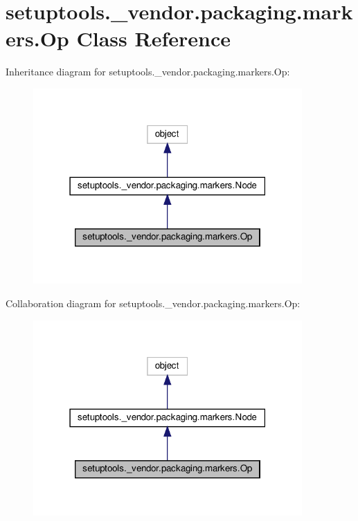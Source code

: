 \hypertarget{classsetuptools_1_1__vendor_1_1packaging_1_1markers_1_1Op}{}\section{setuptools.\+\_\+vendor.\+packaging.\+markers.\+Op Class Reference}
\label{classsetuptools_1_1__vendor_1_1packaging_1_1markers_1_1Op}


Inheritance diagram for setuptools.\+\_\+vendor.\+packaging.\+markers.\+Op\+:
\nopagebreak
\begin{figure}[H]
\begin{center}
\leavevmode
\includegraphics[width=291pt]{classsetuptools_1_1__vendor_1_1packaging_1_1markers_1_1Op__inherit__graph}
\end{center}
\end{figure}


Collaboration diagram for setuptools.\+\_\+vendor.\+packaging.\+markers.\+Op\+:
\nopagebreak
\begin{figure}[H]
\begin{center}
\leavevmode
\includegraphics[width=291pt]{classsetuptools_1_1__vendor_1_1packaging_1_1markers_1_1Op__coll__graph}
\end{center}
\end{figure}
